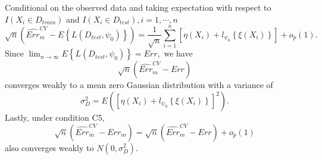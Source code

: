 \documentclass[12pt]{article}
\begin{document}
Conditional on the observed data and taking expectation with respect to 
$I(X_i\in D_{train})$ and $I(X_i \in D_{test}), i=1, \cdots, n$
$$ \sqrt{n}\left(\widehat{Err}^{CV}_m-E\left\{L(D_{test}, \psi_0)\right\}\right)=\frac{1}{\sqrt{n}}\sum_{i=1}^n \left [ \eta(X_i)+l_{\psi_0}\left\{\xi(X_i)\right\}\right]+o_p(1).$$
Since $\lim_{n\rightarrow \infty} E\left\{L(D_{test}, \psi_0)\right\}=Err,$ we have 
$$ \sqrt{n}\left(\widehat{Err}^{CV}_m-Err\right) $$ 
converges weakly to a mean zero Gaussian distribution with a variance of 
$$\sigma_D^2=E\left(\left [ \eta(X_i)+l_{\psi_0}\left\{\xi(X_i)\right\}\right]^2\right).$$
Lastly, under condition C5, 
$$ \sqrt{n}\left(\widehat{Err}^{CV}_m-Err_m\right)= \sqrt{n}\left(\widehat{Err}^{CV}_m-Err\right) +o_p(1)$$ 
also converges weakly to $N(0, \sigma_D^2).$













\end{document}
